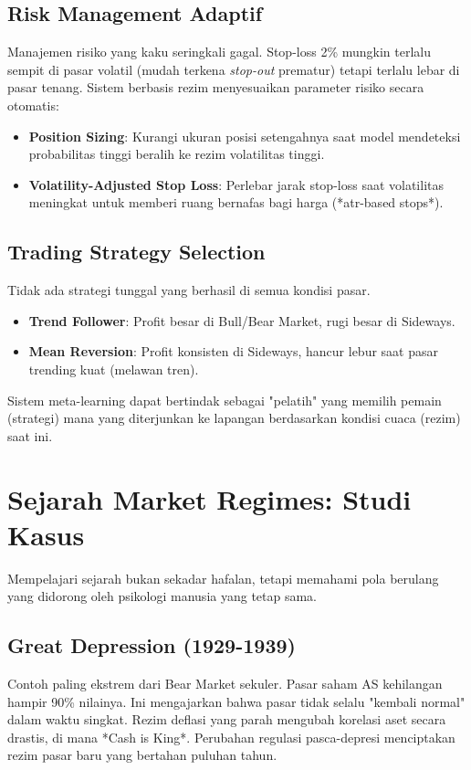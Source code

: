 \documentclass[12pt,a4paper]{book}
\begin{document}
\subsection{Risk Management Adaptif}
Manajemen risiko yang kaku seringkali gagal. Stop-loss 2\% mungkin terlalu sempit di pasar volatil (mudah terkena \textit{stop-out} prematur) tetapi terlalu lebar di pasar tenang.
Sistem berbasis rezim menyesuaikan parameter risiko secara otomatis:
\begin{itemize}
    \item \textbf{Position Sizing}: Kurangi ukuran posisi setengahnya saat model mendeteksi probabilitas tinggi beralih ke rezim volatilitas tinggi.
    \item \textbf{Volatility-Adjusted Stop Loss}: Perlebar jarak stop-loss saat volatilitas meningkat untuk memberi ruang bernafas bagi harga (*atr-based stops*).
\end{itemize}

\subsection{Trading Strategy Selection}
Tidak ada strategi tunggal yang berhasil di semua kondisi pasar.
\begin{itemize}
    \item \textbf{Trend Follower}: Profit besar di Bull/Bear Market, rugi besar di Sideways.
    \item \textbf{Mean Reversion}: Profit konsisten di Sideways, hancur lebur saat pasar trending kuat (melawan tren).
\end{itemize}
Sistem meta-learning dapat bertindak sebagai "pelatih" yang memilih pemain (strategi) mana yang diterjunkan ke lapangan berdasarkan kondisi cuaca (rezim) saat ini.

\section{Sejarah Market Regimes: Studi Kasus}
Mempelajari sejarah bukan sekadar hafalan, tetapi memahami pola berulang yang didorong oleh psikologi manusia yang tetap sama.

\subsection{Great Depression (1929-1939)}
Contoh paling ekstrem dari Bear Market sekuler. Pasar saham AS kehilangan hampir 90\% nilainya. Ini mengajarkan bahwa pasar tidak selalu "kembali normal" dalam waktu singkat. Rezim deflasi yang parah mengubah korelasi aset secara drastis, di mana *Cash is King*. Perubahan regulasi pasca-depresi menciptakan rezim pasar baru yang bertahan puluhan tahun.
\end{document}
